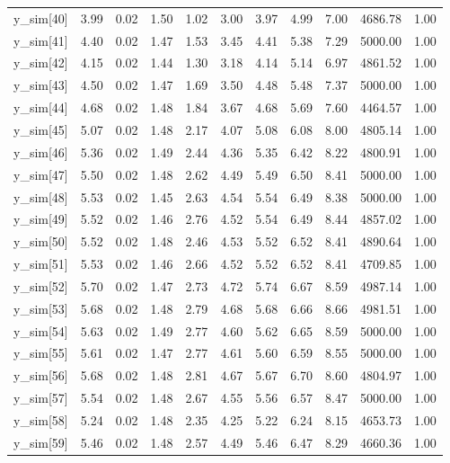 \begin{table}[ht]
\begin{tabular}{rrrrrrrrrrr}
  y\_sim[40] & 3.99 & 0.02 & 1.50 & 1.02 & 3.00 & 3.97 & 4.99 & 7.00 & 4686.78 & 1.00 \\ 
  y\_sim[41] & 4.40 & 0.02 & 1.47 & 1.53 & 3.45 & 4.41 & 5.38 & 7.29 & 5000.00 & 1.00 \\ 
  y\_sim[42] & 4.15 & 0.02 & 1.44 & 1.30 & 3.18 & 4.14 & 5.14 & 6.97 & 4861.52 & 1.00 \\ 
  y\_sim[43] & 4.50 & 0.02 & 1.47 & 1.69 & 3.50 & 4.48 & 5.48 & 7.37 & 5000.00 & 1.00 \\ 
  y\_sim[44] & 4.68 & 0.02 & 1.48 & 1.84 & 3.67 & 4.68 & 5.69 & 7.60 & 4464.57 & 1.00 \\ 
  y\_sim[45] & 5.07 & 0.02 & 1.48 & 2.17 & 4.07 & 5.08 & 6.08 & 8.00 & 4805.14 & 1.00 \\ 
  y\_sim[46] & 5.36 & 0.02 & 1.49 & 2.44 & 4.36 & 5.35 & 6.42 & 8.22 & 4800.91 & 1.00 \\ 
  y\_sim[47] & 5.50 & 0.02 & 1.48 & 2.62 & 4.49 & 5.49 & 6.50 & 8.41 & 5000.00 & 1.00 \\ 
  y\_sim[48] & 5.53 & 0.02 & 1.45 & 2.63 & 4.54 & 5.54 & 6.49 & 8.38 & 5000.00 & 1.00 \\ 
  y\_sim[49] & 5.52 & 0.02 & 1.46 & 2.76 & 4.52 & 5.54 & 6.49 & 8.44 & 4857.02 & 1.00 \\ 
  y\_sim[50] & 5.52 & 0.02 & 1.48 & 2.46 & 4.53 & 5.52 & 6.52 & 8.41 & 4890.64 & 1.00 \\ 
  y\_sim[51] & 5.53 & 0.02 & 1.46 & 2.66 & 4.52 & 5.52 & 6.52 & 8.41 & 4709.85 & 1.00 \\ 
  y\_sim[52] & 5.70 & 0.02 & 1.47 & 2.73 & 4.72 & 5.74 & 6.67 & 8.59 & 4987.14 & 1.00 \\ 
  y\_sim[53] & 5.68 & 0.02 & 1.48 & 2.79 & 4.68 & 5.68 & 6.66 & 8.66 & 4981.51 & 1.00 \\ 
  y\_sim[54] & 5.63 & 0.02 & 1.49 & 2.77 & 4.60 & 5.62 & 6.65 & 8.59 & 5000.00 & 1.00 \\ 
  y\_sim[55] & 5.61 & 0.02 & 1.47 & 2.77 & 4.61 & 5.60 & 6.59 & 8.55 & 5000.00 & 1.00 \\ 
  y\_sim[56] & 5.68 & 0.02 & 1.48 & 2.81 & 4.67 & 5.67 & 6.70 & 8.60 & 4804.97 & 1.00 \\ 
  y\_sim[57] & 5.54 & 0.02 & 1.48 & 2.67 & 4.55 & 5.56 & 6.57 & 8.47 & 5000.00 & 1.00 \\ 
  y\_sim[58] & 5.24 & 0.02 & 1.48 & 2.35 & 4.25 & 5.22 & 6.24 & 8.15 & 4653.73 & 1.00 \\ 
  y\_sim[59] & 5.46 & 0.02 & 1.48 & 2.57 & 4.49 & 5.46 & 6.47 & 8.29 & 4660.36 & 1.00 \\ 

\end{tabular}
\end{table}
